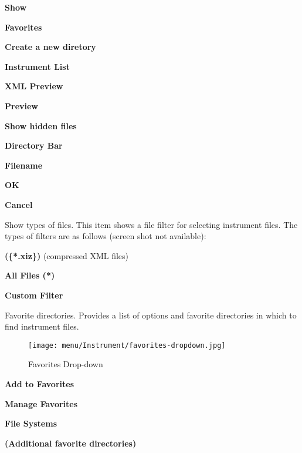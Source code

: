    \begin{enumber}
      \item \textbf{Show}
      \item \textbf{Favorites}
      \item \textbf{Create a new diretory}
      \item \textbf{Instrument List}
      \item \textbf{XML Preview}
      \item \textbf{Preview}
      \item \textbf{Show hidden files}
      \item \textbf{Directory Bar}
      \item \textbf{Filename}
      \item \textbf{OK}
      \item \textbf{Cancel}
   \end{enumber}

   \setcounter{ItemCounter}{0}      %

   Show types of files.
   This item shows a file filter for selecting instrument files.
   The types of filters are as follows (screen shot not available):

   \begin{enumber}
      \item \textbf{(\{*.xiz\})} (compressed XML files)
      \item \textbf{All Files (*)}
      \item \textbf{Custom Filter}
   \end{enumber}

   Favorite directories.
   Provides a list of options and favorite directories in which to find 
   instrument files.

\begin{figure}[H]
   \centering 
   \texttt{[image: menu/Instrument/favorites-dropdown.jpg]}
   \caption{Favorites Drop-down}
   \label{fig:open_instrument_favorites}
\end{figure}

   \begin{enumber}
      \item \textbf{Add to Favorites}
      \item \textbf{Manage Favorites}
      \item \textbf{File Systems}
      \item \textbf{(Additional favorite directories)}
   \end{enumber}


